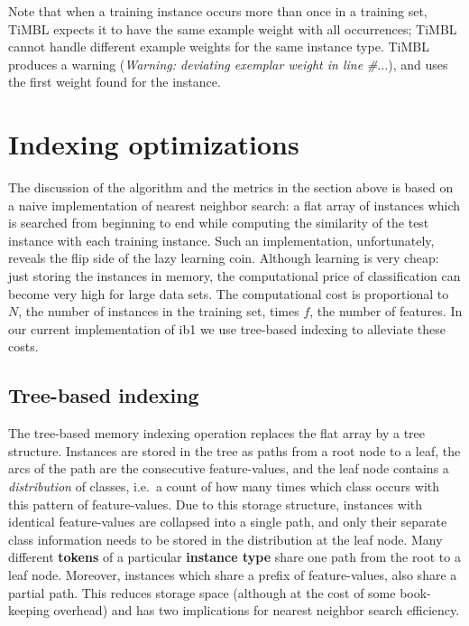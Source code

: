 \documentclass{report}
\begin{document}
Note that when a training instance occurs more than once in a training
set, TiMBL expects it to have the same example weight with all
occurrences; TiMBL cannot handle different example weights for the
same instance type. TiMBL produces a warning ({\em Warning: deviating
  exemplar weight in line \#$\ldots$}), and uses the first weight found for
the instance.

\section{Indexing optimizations}
\label{indexing}

The discussion of the algorithm and the metrics in the section above
is based on a naive implementation of nearest neighbor search: a flat
array of instances which is searched from beginning to end while
computing the similarity of the test instance with each training
instance. Such an implementation, unfortunately, reveals the flip side
of the lazy learning coin. Although learning is very cheap: just
storing the instances in memory, the computational price of
classification can become very high for large data sets. The
computational cost is proportional to $N$, the number of instances in
the training set, times $f$, the number of features. In our current
implementation of {\sc ib1} we use tree-based indexing to alleviate
these costs.

\subsection{Tree-based indexing}

The tree-based memory indexing operation replaces the flat array
by a tree structure. Instances are stored in the tree as
paths from a root node to a leaf, the arcs of the path are the
consecutive feature-values, and the leaf node contains a {\em
distribution}\/ of classes, i.e.~a count of how many times which class
occurs with this pattern of feature-values. %
Due to this storage structure, instances with identical feature-values
are collapsed into a single path, and only their separate class
information needs to be stored in the distribution at the leaf
node. Many different {\bf tokens} of a particular {\bf instance type}
share one path from the root to a leaf node. Moreover, instances which
share a prefix of feature-values, also share a partial path. This
reduces storage space (although at the cost of some book-keeping
overhead) and has two implications for nearest neighbor search
efficiency.
\end{document}
